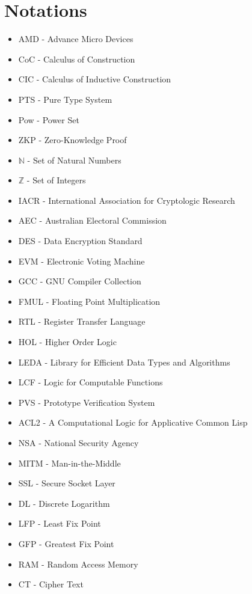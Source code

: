 \chapter*{Notations}


\begin{itemize}


\item AMD - Advance Micro Devices
\item CoC  - Calculus of Construction
\item CIC - Calculus of Inductive Construction
\item PTS - Pure Type System
\item Pow - Power Set
\item ZKP - Zero-Knowledge Proof
\item $\mathbb{N}$ - Set of Natural Numbers
\item $\mathbb{Z}$ - Set of Integers
\item IACR  - International Association for Cryptologic Research
\item AEC - Australian Electoral Commission
\item DES - Data Encryption Standard
\item EVM - Electronic Voting Machine
\item GCC - GNU Compiler Collection 
\item FMUL - Floating Point Multiplication
\item RTL - Register Transfer Language
\item HOL - Higher Order Logic
\item LEDA - Library for Efficient Data Types and Algorithms
\item LCF - Logic for Computable Functions
\item PVS - Prototype Verification System
\item ACL2 - A Computational Logic for Applicative Common Lisp
\item NSA - National Security Agency
\item MITM - Man-in-the-Middle
\item SSL - Secure Socket Layer
\item DL - Discrete Logarithm
\item LFP - Least Fix Point
\item GFP - Greatest Fix Point
\item RAM - Random Access Memory
\item CT - Cipher Text
\end{itemize}